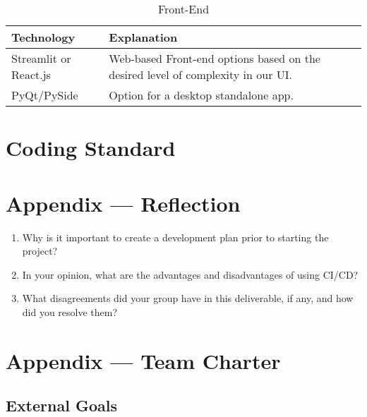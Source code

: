 \documentclass{article}
\begin{document}
\begin{table}[!htbp]
\caption{Front-End} \label{TblFrontEnd}
\begin{tabularx}{\textwidth}{p{3cm}p{7cm}}
\toprule
\textbf{Technology} & \textbf{Explanation}\\
\midrule
Streamlit or React.js & Web-based Front-end options based on the desired level of complexity in our UI.\\
\addlinespace
PyQt/PySide & Option for a desktop standalone app.\\
\bottomrule
\end{tabularx}
\end{table}


\section{Coding Standard}


\newpage{}

\section*{Appendix --- Reflection}




\begin{enumerate}
    \item Why is it important to create a development plan prior to starting the
    project?
    \item In your opinion, what are the advantages and disadvantages of using
    CI/CD?
    \item What disagreements did your group have in this deliverable, if any,
    and how did you resolve them?
\end{enumerate}

\newpage{}

\section*{Appendix --- Team Charter}


\subsection*{External Goals}
\end{document}
